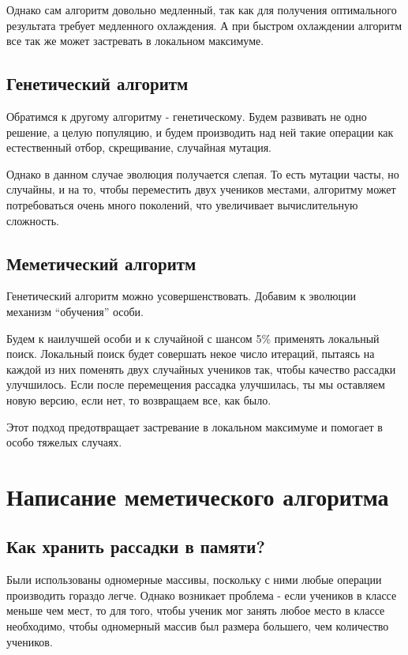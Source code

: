 \documentclass[12pt,a4paper]{extarticle} %
\begin{document}
	Однако сам алгоритм довольно медленный, так как для получения оптимального результата требует медленного охлаждения. А при быстром охлаждении алгоритм все так же может застревать в локальном максимуме.
	
	\subsection{Генетический алгоритм}
	Обратимся к другому алгоритму - генетическому. Будем развивать не одно решение, а целую популяцию, и будем производить над ней такие операции как естественный отбор, скрещивание, случайная мутация.
	
	Однако в данном случае эволюция получается слепая. То есть мутации часты, но случайны, и на то, чтобы переместить двух учеников местами, алгоритму может потребоваться очень много поколений, что увеличивает вычислительную сложность.
	
	\subsection{Меметический алгоритм}
	Генетический алгоритм можно усовершенствовать. Добавим к эволюции механизм “обучения” особи.
	
	Будем к наилучшей особи и к случайной с шансом 5\% применять локальный поиск. Локальный поиск будет совершать некое число итераций, пытаясь на каждой из них поменять двух случайных учеников так, чтобы качество рассадки улучшилось. Если после перемещения рассадка улучшилась, ты мы оставляем новую версию, если нет, то возвращаем все, как было.
	
	Этот подход предотвращает застревание в локальном максимуме и помогает в особо тяжелых случаях.
	
	\section{Написание меметического алгоритма}
	
	\subsection{Как хранить рассадки в памяти?}
	Были использованы одномерные массивы, поскольку с ними любые операции производить гораздо легче. Однако возникает проблема - если учеников в классе меньше чем мест, то для того, чтобы ученик мог занять любое место в классе необходимо, чтобы одномерный массив был размера большего, чем количество учеников.
	
\end{document}
